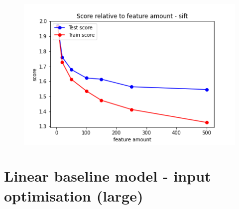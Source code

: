 \begin{figure}[H]
  \centering
  \begin{minipage}[b]{0.4\textwidth}
    \includegraphics[width=\textwidth]{images/2-LBM-feature_amount_sift_small_values.png}
  \end{minipage}
\end{figure}


\section*{Linear baseline model - input optimisation (large)}

